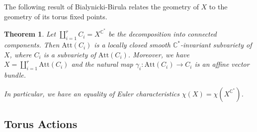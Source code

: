 \documentclass{amsart}
\newtheorem{theorem}{Theorem}[section]
\newcommand{\C}{\mathbb{C}}
\begin{document}
The following result of Bialynicki-Birula relates the geometry of $X$ to the geometry of its torus fixed points.
\begin{theorem}
  \cite[Section 4]{bb}
  Let $\coprod_{i=1}^r C_i= X^{\C^\ast}$ be the decomposition into connected components.
  Then $\mathrm{Att}(C_i)$ is a locally closed smooth $\C^\ast$-invariant subvariety of $X$, where $C_i$ is a subvariety of $\mathrm{Att}(C_i)$.
  Moreover, we have $X=\coprod_{i=1}^r\mathrm{Att}(C_i)$ and the natural map $\gamma_i:\mathrm{Att}(C_i)\to C_i$ is an affine vector bundle. 

  In particular, we have an equality of Euler characteristics $\chi(X)=\chi(X^{\C^\ast})$.
\end{theorem}

\subsection{Torus Actions}
\label{torusaction}
\end{document}
